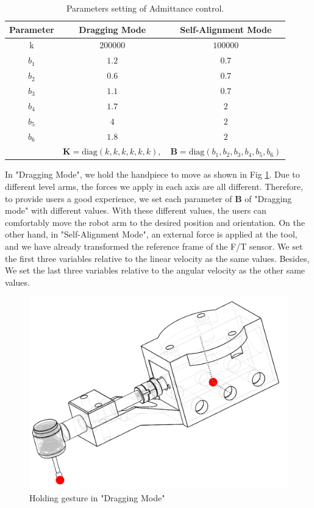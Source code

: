 \begin{table}[htbp]
\centering
\caption{Parameters setting of Admittance control.}
\label{tab: para_adm}
\begin{tabular}{ccc} 
\hline \hline
Parameter	&Dragging Mode		&Self-Alignment Mode	\\
\hline
k			&$200000$			&$100000$				\\
$b_1$		&$1.2$				&$0.7$					\\
$b_2$		&$0.6$				&$0.7$					\\
$b_3$		&$1.1$				&$0.7$					\\
$b_4$		&$1.7$				&$2$					\\
$b_5$		&$4$				&$2$					\\
$b_6$		&$1.8$				&$2$					\\
\hline	
&$\mathbf{K} = \text{diag}(k,k,k,k,k,k),$ &$\mathbf{B} = \text{diag}(b_1,b_2,b_3,b_4,b_5,b_6)$\\
\hline\hline	
\end{tabular}
\end{table}
\par
In "Dragging Mode", we hold the handpiece to move as shown in Fig \ref{fig:holding gesture}. Due to different level arms, the forces we apply in each axis are all different. Therefore, to provide users a good experience, we set each parameter of $\mathbf{B}$ of "Dragging mode"  with different values. With these different values, the users can comfortably move the robot arm to the desired position and orientation. On the other hand, in "Self-Alignment Mode", an external force is applied at the tool, and we have already transformed the reference frame of the F/T sensor. We set the first three variables relative to the linear velocity as the same values. Besides, We set the last three variables relative to the angular velocity as the other same values.
\begin{figure}[htbp]
\begin{center}
\includegraphics[width=0.7\linewidth]{Images/holding_gesture.png}
\caption{
Holding gesture in "Dragging Mode"
}\label{fig:holding gesture}
\end{center}
\end{figure}
